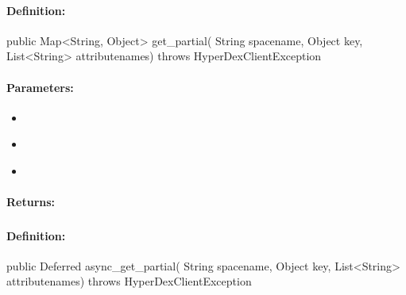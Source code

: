 \paragraph{Definition:}
\begin{javacode}
public Map<String, Object> get_partial(
        String spacename,
        Object key,
        List<String> attributenames) throws HyperDexClientException
\end{javacode}

\paragraph{Parameters:}
\begin{itemize}[noitemsep]
\item {}\\

\item {}\\

\item {}\\

\end{itemize}

\paragraph{Returns:}


\pagebreak
\subsubsection{}
\label{api:java:async_get_partial}


\paragraph{Definition:}
\begin{javacode}
public Deferred async_get_partial(
        String spacename,
        Object key,
        List<String> attributenames) throws HyperDexClientException
\end{javacode}

